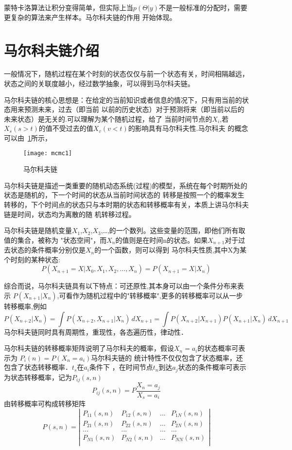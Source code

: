     蒙特卡洛算法让积分变得简单，但实际上当$p(\Theta|y)$不是一般标准的分配时，需要更复杂的算法来产生样本。马尔科夫链的作用
开始体现。

\section{马尔科夫链介绍}
   一般情况下，随机过程在某个时刻的状态仅仅与前一个状态有关，时间相隔越远，状态之间的关联度越小，经过数学抽象，可以得到马尔科夫链。

    马尔科夫链的核心思想是：在给定的当前知识或者信息的情况下，只有用当前的状态用来预测未来，过去（即当前
以前的历史状态）对于预测将来（即当前以后的未来状态）是无关的.可以理解为某个随机过程，给了
当前时间节点的$X_i$,若$X_s(s>t)$的值不受过去的值$X_v(v<t)$的影响具有马尔科夫性.马尔科夫
的概念可以由~\ref{fig:mcmc1}所示，

    \begin{figure}[htbp]
    \centering
    \texttt{[image: mcmc1]}
    \caption{马尔科夫链}\label{fig:mcmc1}
    \vspace{\baselineskip}
    \end{figure}

  马尔科夫链是描述一类重要的随机动态系统(过程)的模型，系统在每个时期所处的状态是随机的，下一个时间的状态从当前时间状态的
转移是按照一个的概率发生转移的，下个时间点的状态只与本时期的状态和转移概率有关，本质上讲马尔科夫链是时间，状态均为离散的随
机转移过程。

马尔科夫链是随机变量$X_1$,$X_2$,$X_3$,\ldots,的一个数列。这些变量的范围，即他们所有取值的集合，被称为
"状态空间"，而$X_n$的值则是在时间n的状态。如果$X_{n+1}$对于过去状态的条件概率分别仅是$X_n$的一个函数，则可以得到
马尔科夫性质,其中X为某个时刻的某种状态: $$P(X_{n+1} = X|X_0,X_1,X_2,\ldots,X_n)=P(X_{n+1} = X|X_n) $$
    
    综合而说，马尔科夫链具有以下特点：可还原性,其本身可以由一个条件分布来表示
$ P(X_{n+1}|X_{n})$,可看作为随机过程中的"转移概率",更多的转移概率可以从一步转移概率,例如
\[ P(X_{n+2}|X_n) =  \int P(X_{n+2},X_{n+1}|X_n) \,dX_{n+1} = \int P(X_{n+2}|X_{n+1}) P(X_{n+1}|X_n) \,dX_{n+1}\]  
马尔科夫链同时具有周期性，重现性，各态遍历性，律动性．

    马尔科夫链的转移概率矩阵说明了马尔科夫的概率，假设$X_n=a_i$的状态概率可表示为 $P_i(n)=P(X_n=a_i)$马尔科夫链的
统计特性不仅仅包含了状态概率，还包含了状态转移概率．$t_s$在$a_i$条件下
，在时间节点$t_n$到达$a_j$状态的条件概率可表示为状态转移概率，记为$P_{ij}(s,n)$
    \[ P_{ij}(s,n)=P{\frac{X_n=a_j}{X_s=a_i}} \]  
    由转移概率可构成转移矩阵
    \[ P(s,n) = \left | \begin{array}{cccc}
        P_{11}(s,n) & P_{12}(s,n)  & \ldots &P_{1N}(s,n) \\
        P_{21}(s,n) & P_{22}(s,n)  & \ldots &P_{2N}(s,n) \\
        \ldots      & \ldots      & \ldots & \ldots    \\
        P_{N1}(s,n) & P_{N2}(s,n)  & \ldots &P_{NN}(s,n) \\
        \end{array} \right| \]

